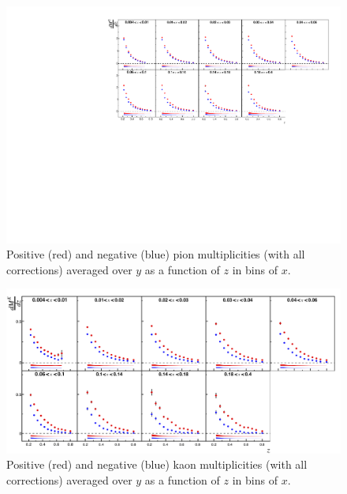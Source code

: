 \begin{figure}[!h]
  \centering
	\includegraphics[scale=0.85]{./gfx/piyavg.pdf}
	\caption{Positive (red) and negative (blue) pion multiplicities (with all corrections) averaged over $y$ as a function of $z$ in bins of $x$.}
	\label{pic:mpiyavg}
\end{figure}

\newpage

\begin{figure}[!h]
  \centering
	\includegraphics[scale=0.85]{./gfx/Kyavg.png}
	\caption{Positive (red) and negative (blue) kaon multiplicities (with all corrections) averaged over $y$ as a function of $z$ in bins of $x$.}
	\label{pic:mkyavg}
\end{figure}

